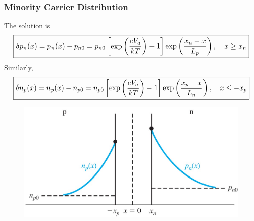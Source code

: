 \documentclass{beamer}
\begin{document}
    \begin{frame} \frametitle{Minority Carrier Distribution}
        The solution is
        \begin{equation*}
            \resizebox*{\textwidth}{!}{
                \boxed{\delta p_n(x) = p_n(x) - p_{n0} = p_{n0} \left[ \exp\left( \dfrac{eV_a}{kT} \right) - 1\right] \exp\left( \dfrac{x_n - x}{L_p}  \right), \quad x \ge x_n}
            }
        \end{equation*}
        Similarly,
        \begin{equation*}
            \resizebox*{\textwidth}{!}{
                \boxed{\delta n_p(x) = n_p(x) - n_{p0} = n_{p0} \left[ \exp\left( \dfrac{eV_a}{kT}  \right) - 1 \right] \exp \left( \dfrac{x_p + x}{L_n}  \right), \quad x \le - x_p}
            }
        \end{equation*}
        \begin{figure}[H]
            \centering
            \includegraphics[width=0.6\linewidth]{Forward-biased-solution.jpg}
            \label{fig:Forward-biased-solution.jpg}
        \end{figure}
    \end{frame}
\end{document}
